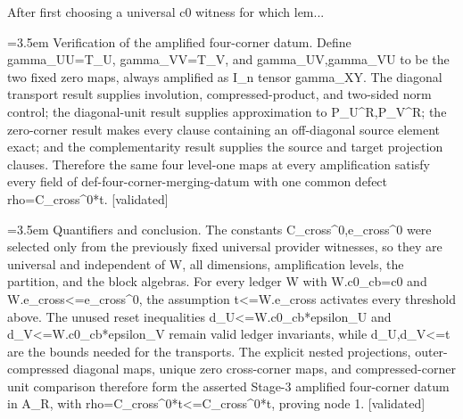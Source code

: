 \documentclass{article}
\newcommand{\step}[1]{\par\noindent\hangindent=3.5em\hangafter=1%
  \makebox[3.5em][l]{\textbf{#1.}}}
\newcommand{\steptag}[1]{\hfill{\small\textsf{[#1]}}}
\begin{document}
\begin{proofbox}{After first choosing a universal c0 witness for which lem...}
\step{1.8} Verification of the amplified four-corner datum. Define gamma\_UU=T\_U, gamma\_VV=T\_V, and gamma\_UV,gamma\_VU to be the two fixed zero maps, always amplified as I\_n tensor gamma\_XY. The diagonal transport result supplies involution, compressed-product, and two-sided norm control; the diagonal-unit result supplies approximation to P\_U\textasciicircum{}R,P\_V\textasciicircum{}R; the zero-corner result makes every clause containing an off-diagonal source element exact; and the complementarity result supplies the source and target projection clauses. Therefore the same four level-one maps at every amplification satisfy every field of def-four-corner-merging-datum with one common defect rho=C\_cross\textasciicircum{}0*t. \steptag{validated} \\[4pt]
\step{1.9} Quantifiers and conclusion. The constants C\_cross\textasciicircum{}0,e\_cross\textasciicircum{}0 were selected only from the previously fixed universal provider witnesses, so they are universal and independent of W, all dimensions, amplification levels, the partition, and the block algebras. For every ledger W with W.c0\_cb=c0 and W.e\_cross<=e\_cross\textasciicircum{}0, the assumption t<=W.e\_cross activates every threshold above. The unused reset inequalities d\_U<=W.c0\_cb*epsilon\_U and d\_V<=W.c0\_cb*epsilon\_V remain valid ledger invariants, while d\_U,d\_V<=t are the bounds needed for the transports. The explicit nested projections, outer-compressed diagonal maps, unique zero cross-corner maps, and compressed-corner unit comparison therefore form the asserted Stage-3 amplified four-corner datum in A\_R, with rho=C\_cross\textasciicircum{}0*t<=C\_cross\textasciicircum{}0*t, proving node 1. \steptag{validated} \\[4pt]
\end{proofbox}
\end{document}
